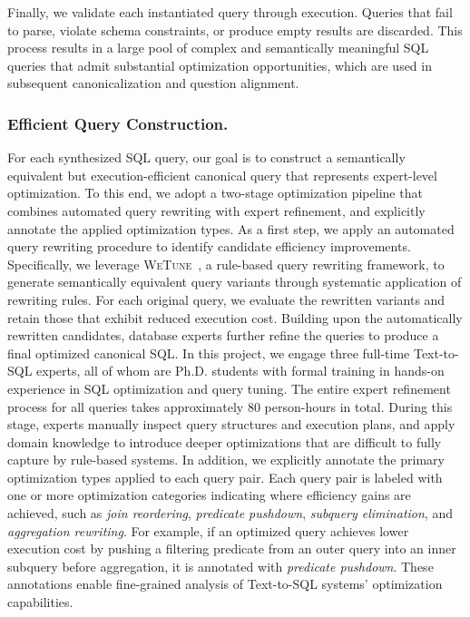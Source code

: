 Finally, we validate each instantiated query through execution.
Queries that fail to parse, violate schema constraints, or produce empty results are discarded.
This process results in a large pool of complex and semantically meaningful SQL queries that admit substantial optimization opportunities, which are used in subsequent canonicalization and question alignment.

\subsubsection{Efficient Query Construction.}
For each synthesized SQL query, our goal is to construct a semantically equivalent but execution-efficient canonical query that represents expert-level optimization.
To this end, we adopt a two-stage optimization pipeline that combines automated query rewriting with expert refinement, and explicitly annotate the applied optimization types.
As a first step, we apply an automated query rewriting procedure to identify candidate efficiency improvements.
Specifically, we leverage \textsc{WeTune}~\cite{wang2022wetune}, a rule-based query rewriting framework, to generate semantically equivalent query variants through systematic application of rewriting rules.
For each original query, we evaluate the rewritten variants and retain those that exhibit reduced execution cost.
Building upon the automatically rewritten candidates, database experts further refine the queries to produce a final optimized canonical SQL.
In this project, we engage three full-time Text-to-SQL experts, all of whom are Ph.D. students with formal training in hands-on experience in SQL optimization and query tuning. 
The entire expert refinement process for all queries takes approximately 80 person-hours in total.
During this stage, experts manually inspect query structures and execution plans, and apply domain knowledge to introduce deeper optimizations that are difficult to fully capture by rule-based systems.
In addition, we explicitly annotate the primary optimization types applied to each query pair.
Each query pair is labeled with one or more optimization categories indicating where efficiency gains are achieved, such as \emph{join reordering}, \emph{predicate pushdown}, \emph{subquery elimination}, and \emph{aggregation rewriting}.
For example, if an optimized query achieves lower execution cost by pushing a filtering predicate from an outer query into an inner subquery before aggregation, it is annotated with \emph{predicate pushdown}.
These annotations enable fine-grained analysis of Text-to-SQL systems’ optimization capabilities.


